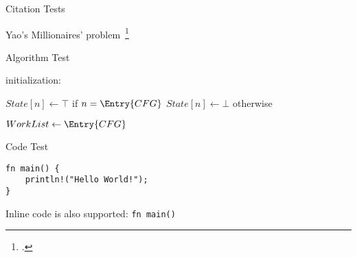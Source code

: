 \begin{frame}{Citation Tests}
	\begin{outline}
		\1 Yao's Millionaires' problem~\footcite{10.5555/1382436.1382751}
	\end{outline}
\end{frame}

\begin{frame}{Algorithm Test}
    \IncMargin{1em}
    \begin{algorithm}[H]
      \DontPrintSemicolon
      \SetVlineSkip{0pt}
      \scriptsize
      initialization: \parbox[t]{\linewidth}{
        $State[n] \leftarrow \top$ if $n=\Entry{CFG}$\;
        $State[n] \leftarrow \bot$ otherwise\;}
    
      $WorkList \leftarrow \Entry{CFG}$\;
      \SetAlCapHSkip{.5em}
      \caption{Basic algorithm for Abstract Interpretation}
    \end{algorithm}
\end{frame}

\begin{frame}[fragile]{Code Test}
    \begin{verbatim}
fn main() {
    println!("Hello World!");
}
    \end{verbatim}
	\begin{outline}
		\1 Inline code is also supported: \texttt{fn main() { }}
	\end{outline}
\end{frame}

